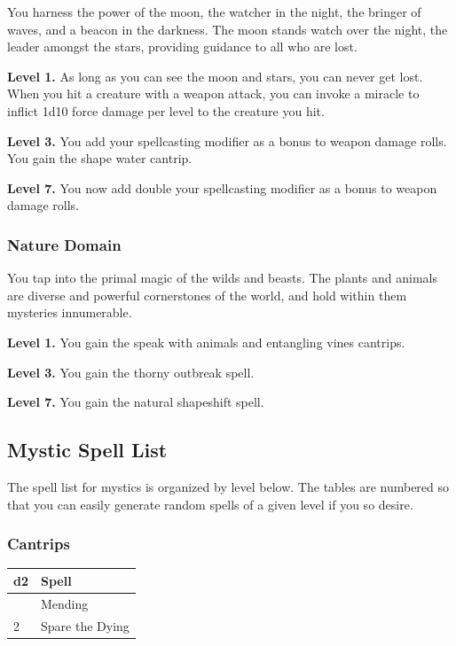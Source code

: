 \documentclass[12pt,letterpaper,twocolumn,openany,nodeprecatedcode,bg=none]{dndbook}
\begin{document}
You harness the power of the moon, the watcher in the night, the bringer
of waves, and a beacon in the darkness. The moon stands watch over the
night, the leader amongst the stars, providing guidance to all who are
lost.

\textbf{Level 1.} As long as you can see the moon and stars, you can
never get lost. When you hit a creature with a weapon attack, you can
invoke a miracle to inflict 1d10 force damage per level to the creature
you hit.

\textbf{Level 3.} You add your spellcasting modifier as a bonus to
weapon damage rolls. You gain the shape water cantrip.

\textbf{Level 7.} You now add double your spellcasting modifier as a
bonus to weapon damage rolls.

\subsubsection{Nature Domain}\label{nature-domain}

You tap into the primal magic of the wilds and beasts. The plants and
animals are diverse and powerful cornerstones of the world, and hold
within them mysteries innumerable.

\textbf{Level 1.} You gain the speak with animals and entangling vines
cantrips.

\textbf{Level 3.} You gain the thorny outbreak spell.

\textbf{Level 7.} You gain the natural shapeshift spell.

\onecolumn

\subsection{Mystic Spell List}\label{mystic-spell-list}

The spell list for mystics is organized by level below. The tables are
numbered so that you can easily generate random spells of a given level
if you so desire.

\subsubsection{Cantrips}\label{cantrips}

\begin{longtable}[]{@{}ll@{}}
\toprule\noalign{}
d2 & Spell \\
\midrule\noalign{}
\endhead
\bottomrule\noalign{}
\endlastfoot
1 & Mending \\
2 & Spare the Dying \\
\end{longtable}
\end{document}
